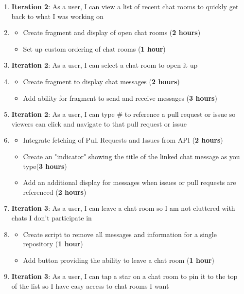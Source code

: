 \documentclass{report}
\begin{document}
\begin{enumerate}
    \item \textbf{Iteration 2}: As a user, I can view a list of recent chat rooms to quickly get back to what I was working on
    \item[] \begin{itemize}
        \item Create fragment and display of open chat rooms (\textbf{2 hours})
        \item Set up custom ordering of chat rooms (\textbf{1 hour})
    \end{itemize}
    \item \textbf{Iteration 2}: As a user, I can select a chat room to open it up
    \item[] \begin{itemize}
        \item Create fragment to display chat messages (\textbf{2 hours})
        \item Add ability for fragment to send and receive messages (\textbf{3 hours})
    \end{itemize}
    \item \textbf{Iteration 2}: As a user, I can type \# to reference a pull request or issue so viewers can click and navigate to that pull request or issue
    \item[] \begin{itemize}
        \item Integrate fetching of Pull Requests and Issues from API (\textbf{2 hours})
        \item Create an "indicator" showing the title of the linked chat message as you type(\textbf{3 hours})
        \item Add an additional display for messages when issues or pull requests are referenced (\textbf{2 hours})
    \end{itemize}
    \item \textbf{Iteration 3}: As a user, I can leave a chat room so I am not cluttered with chats I don't participate in
    \item[] \begin{itemize}
        \item Create script to remove all messages and information for a single repository (\textbf{1 hour})
        \item Add button providing the ability to leave a chat room (\textbf{1 hour})
    \end{itemize}
    \item \textbf{Iteration 3}: As a user, I can tap a star on a chat room to pin it to the top of the list so I have easy access to chat rooms I want

\end{enumerate}
\end{document}

